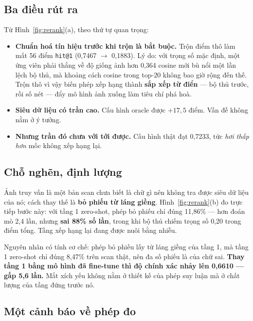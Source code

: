 \documentclass[conference,a4paper]{IEEEtran}
\newcommand{\code}[1]{{\small\texttt{#1}}}
\begin{document}
\subsection{Ba điều rút ra}

Từ Hình~\ref{fig:rerank}(a), theo thứ tự quan trọng:

\begin{itemize}
  \item \textbf{Chuẩn hoá tín hiệu trước khi trộn là bắt buộc.} Trộn điểm thô làm mất 56 điểm
        \code{hit@1} (0,7467 $\rightarrow$ 0,1883). Lý do: với trọng số mặc định, một ứng viên phải
        thắng về độ giống ảnh hơn 0,364 cosine mới bù nổi một lần lệch bộ thủ, mà khoảng cách cosine
        trong top-20 không bao giờ rộng đến thế. Trộn thô vì vậy biến phép xếp hạng thành
        \textbf{sắp xếp từ điển} --- bộ thủ trước, rồi số nét --- đẩy mô hình ảnh xuống làm tiêu chí
        phá hoà.
  \item \textbf{Siêu dữ liệu có trần cao.} Cấu hình oracle được $+17{,}5$ điểm. Vấn đề không nằm ở
        ý tưởng.
  \item \textbf{Nhưng trần đó chưa với tới được.} Cấu hình thật đạt 0,7233, tức \emph{hơi thấp hơn}
        mốc không xếp hạng lại.
\end{itemize}

\subsection{Chỗ nghẽn, định lượng}

Ảnh truy vấn là một bản scan chưa biết là chữ gì nên không tra được siêu dữ liệu của nó; cách thay
thế là \textbf{bỏ phiếu từ láng giềng}. Hình~\ref{fig:rerank}(b) đo trực tiếp bước này: với tầng 1
zero-shot, phép bỏ phiếu chỉ đúng 11,86\% --- hơn đoán mò 2,4 lần, nhưng \textbf{sai 88\% số lần},
trong khi bộ thủ chiếm trọng số 0,20 trong điểm tổng. Tầng xếp hạng lại đang được nuôi bằng nhiễu.

Nguyên nhân có tính cơ chế: phép bỏ phiếu lấy từ láng giềng của tầng 1, mà tầng 1 zero-shot chỉ đúng
8,47\% trên scan thật, nên đa số phiếu là của chữ sai. \textbf{Thay tầng 1 bằng mô hình đã fine-tune
thì độ chính xác nhảy lên 0,6610 --- gấp 5,6 lần.} Mắt xích yếu không nằm ở thiết kế của phép suy
luận mà ở chất lượng của tầng đứng trước nó.

\subsection{Một cảnh báo về phép đo}
\end{document}
